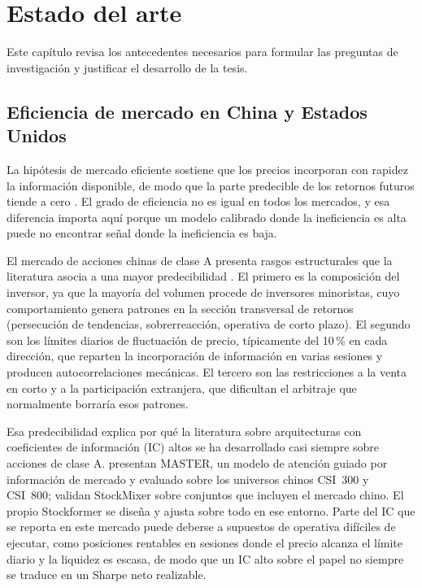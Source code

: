 \chapter{Estado del arte}\label{cap:sota}

Este capítulo revisa los antecedentes necesarios para formular las preguntas de
investigación y justificar el desarrollo de la tesis.

\section{Eficiencia de mercado en China y Estados Unidos}

La hipótesis de mercado eficiente sostiene que los precios incorporan con rapidez la
información disponible, de modo que la parte predecible de los retornos futuros tiende a
cero \autocite{fama1970efficient}. El grado de eficiencia no es igual en todos los
mercados, y esa diferencia importa aquí porque un modelo calibrado donde la ineficiencia
es alta puede no encontrar señal donde la ineficiencia es baja.

El mercado de acciones chinas de clase A presenta rasgos estructurales que la literatura
asocia a una mayor predecibilidad \autocite{liu2019size}. El primero es la composición
del inversor, ya que la mayoría del volumen procede de inversores minoristas, cuyo comportamiento
genera patrones en la sección transversal de retornos (persecución de tendencias,
sobrerreacción, operativa de corto plazo). El segundo son los límites diarios de
fluctuación de precio, típicamente del 10\,\% en cada dirección, que reparten la
incorporación de información en varias sesiones y producen autocorrelaciones mecánicas. El
tercero son las restricciones a la venta en corto y a la participación extranjera, que
dificultan el arbitraje que normalmente borraría esos patrones.

Esa predecibilidad explica por qué la literatura sobre arquitecturas con coeficientes de
información (IC) altos se ha desarrollado casi siempre sobre acciones de clase A.
\textcite{li2024master} presentan MASTER, un modelo de atención guiado por información de
mercado y evaluado sobre los universos chinos CSI~300 y CSI~800; \textcite{fan2024stockmixer}
validan StockMixer sobre conjuntos que incluyen el mercado chino. El propio Stockformer
\parencite{ma2024stockformer} se diseña y ajusta sobre todo en ese entorno. Parte del IC
que se reporta en este mercado puede deberse a supuestos de operativa difíciles de
ejecutar, como posiciones rentables en sesiones donde el precio alcanza el límite diario y
la liquidez es escasa, de modo que un IC alto sobre el papel no siempre se traduce en un
Sharpe neto realizable.

